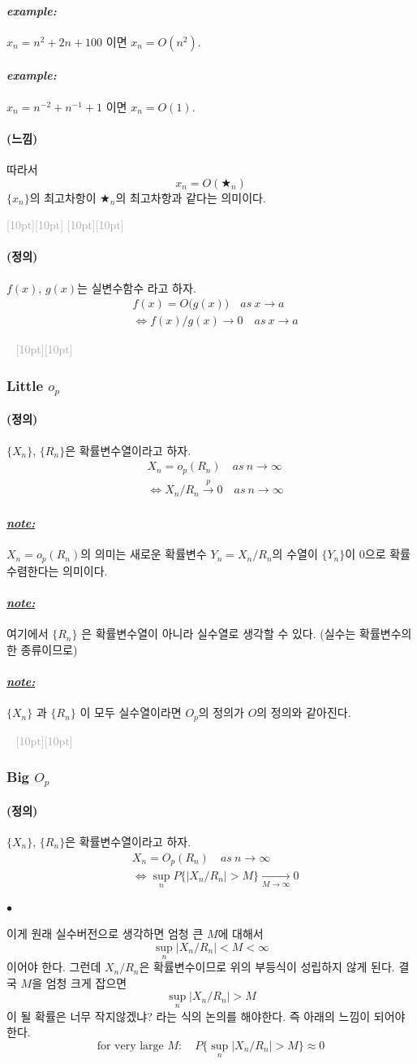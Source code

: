 \documentclass[12pt,oneside,english]{book}
\newcommand{\dash}{\vspace{2em}\noindent \textcolor{darkgray}{\hrulefill~ \raisebox{-2.5pt}[10pt][10pt]{\leafright \decofourleft \decothreeleft  \aldineright \decotwo \floweroneleft \decoone   \floweroneright \decotwo \aldineleft\decothreeright \decofourright \leafleft} ~  \hrulefill \\ \vspace{2em}}}
\newcommand{\rdash}{\noindent \textcolor{darkgray}{ \raisebox{-1.9pt}[10pt][10pt]{\leafright} \hrulefill \raisebox{-1.9pt}[10pt][10pt]{\leafright \decofourleft \decothreeleft  \aldineright \decotwo \floweroneleft \decoone}}}
\def\ck{\paragraph{\Large$\bullet$}\Large}
\def\dfn{\paragraph{\Large(정의)}\Large}
\def\fl{\paragraph{\Large(느낌)}\Large}
\def\note{\paragraph{\Large\textit{\underline{note:}}}\Large}
\def\ex{\paragraph{\Large\textit{example:}}\Large}
\begin{document}
\ex $x_n=n^2+2n+100$ 이면 $x_n=O(n^2)$.

\ex $x_n=n^{-2}+n^{-1}+1$ 이면 $x_n=O(1)$.

\fl 따라서 
\[
x_n=O(\bigstar_n)
\]
$\{x_n\}$의 최고차항이 $\bigstar_n$의 최고차항과 같다는 의미이다. 

\rdash 

\dfn $f(x)$, $g(x)$는 실변수함수 라고 하자. 
\begin{align*}
& f(x)=O\big(g(x)\big) \quad as~  x\to a \\
&\Longleftrightarrow f(x)/g(x) \to 0 \quad as ~ x \to a
\end{align*}

\dash

\subsubsection{Little $o_p$}
\dfn $\{X_n\}$, $\{R_n\}$은 확률변수열이라고 하자. 
\begin{align*}
& X_n=o_p(R_n) \quad as ~ n\to \infty \\ 
& \Longleftrightarrow X_n/R_n \overset{p}{\to} 0 \quad as ~ n\to \infty 
\end{align*}

\note $X_n=o_p(R_n)$의 의미는 새로운 확률변수 $Y_n=X_n/R_n$의 수열이 $\{Y_n\}$이 $0$으로 확률수렴한다는 의미이다. 

\note 여기에서 $\{R_n\}$ 은 확률변수열이 아니라 실수열로 생각할 수 있다. (실수는 확률변수의 한 종류이므로)

\note $\{X_n\}$ 과 $\{R_n\}$ 이 모두 실수열이라면 $O_p$의 정의가 $O$의 정의와 같아진다. 

\dash

\subsubsection{Big $O_p$}
\dfn $\{X_n\}$, $\{R_n\}$은 확률변수열이라고 하자. 
\begin{align*}
& X_n=O_p(R_n) \quad as ~ n\to \infty \\ 
& \Longleftrightarrow \sup_{n}P\{|X_n/R_n|>M\} \underset{M\to\infty}{\to} 0
\end{align*}

\ck 이게 원래 실수버전으로 생각하면 엄청 큰 $M$에 대해서 
\[
\sup_{n}|X_n / R_n| < M < \infty
\]
이어야 한다. 그런데 $X_n/R_n$은 확률변수이므로 위의 부등식이 성립하지 않게 된다. 결국 $M$을 엄청 크게 잡으면 
\[
\sup_{n}|X_n / R_n| > M 
\]
이 될 확률은 너무 작지않겠냐? 라는 식의 논의를 해야한다. 즉 아래의 느낌이 되어야 한다. 
\[
\mbox{for very large $M$}:\quad P\{\sup_{n}|X_n / R_n| > M \} \approx 0
\]
\end{document}
